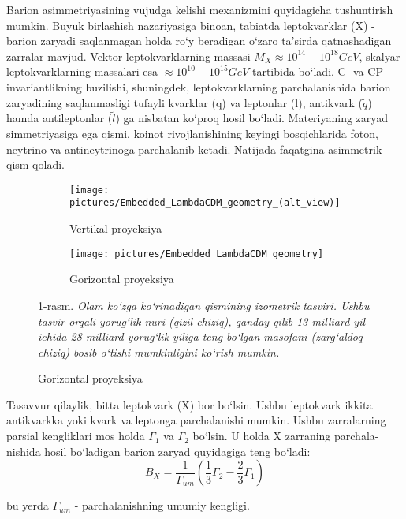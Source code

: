 \documentclass[14pt]{scrartcl}
\begin{document}
Barion asimmetriyasining vujudga kelishi mexanizmini quyidagicha tushuntirish mumkin. Buyuk birlashish nazariyasiga binoan, tabiatda leptokvarklar (X) - barion zaryadi saqlanmagan holda ro`y beradigan o`zaro ta'sirda qatnashadigan zarralar mavjud. Vektor leptokvarklarning massasi $M_{X}\approx10^{14} - 10^{18}GeV$, skalyar leptokvarklarning massalari esa $\approx10^{10}-10^{15}GeV$ tartibida bo`ladi. C- va CP- invariantlikning buzilishi, shuningdek, leptokvarklarning parchalanishida barion zaryadining saqlanmasligi tufayli kvarklar (q) va leptonlar (l), antikvark ($\tilde{q}$) hamda antileptonlar ($\tilde{l}$) ga nisbatan ko`proq hosil bo`ladi. Materiyaning zaryad simmetriyasiga ega qismi, koinot rivojlanishining keyingi bosqichlarida foton, neytrino va antineytrinoga parchalanib ketadi. Natijada faqatgina asimmetrik qism qoladi. 
\renewcommand{\figurename}{-rasm.}
\begin{figure}
	\centering
	\begin{subfigure}{.5\textwidth}
		\centering
		\texttt{[image: pictures/Embedded\_LambdaCDM\_geometry\_(alt\_view)]}
		\caption{Vertikal proyeksiya}
	\label{fig:embeddedlambdacdmgeometryaltview}
	\end{subfigure}%
	\begin{subfigure}{.5\textwidth}
		\centering
		\texttt{[image: pictures/Embedded\_LambdaCDM\_geometry]}
		\caption{Gorizontal proyeksiya}
		\label{fig:embeddedlambdacdmgeometry}
	\end{subfigure}
	1-rasm.
	\textit{Olam ko`zga ko`rinadigan qismining izometrik tasviri. Ushbu tasvir orqali yorug`lik nuri (qizil chiziq), qanday qilib 13 milliard yil ichida 28 milliard yorug`lik yiliga teng bo`lgan masofani (zarg`aldoq chiziq) bosib o`tishi mumkinligini ko`rish mumkin.}
	\label{fig:test}
\end{figure}




Tasavvur qilaylik, bitta leptokvark (X) bor bo`lsin. Ushbu leptokvark ikkita antikvarkka yoki kvark va leptonga parchalanishi mumkin. Ushbu zarralarning parsial kengliklari mos holda $\Gamma_{1}$ va $\Gamma_{2}$ bo`lsin. U holda X zarraning parchala-nishida hosil bo`ladigan barion zaryad quyidagiga teng bo`ladi:
\begin{equation}
B_{X} = \frac{1}{\Gamma_{um}}\left(\frac{1}{3}\Gamma_{2} -\frac{2}{3}\Gamma_{1}\right)
\label{2}
\end{equation}

bu yerda $\Gamma_{um}$ - parchalanishning umumiy kengligi.
\end{document}
